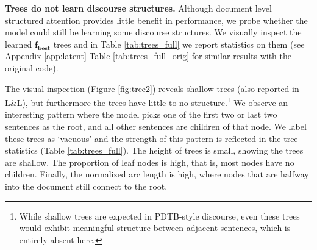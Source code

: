 \begin{table}[t]
\small
\centering
\renewcommand{\tabcolsep}{1.3mm}
\vspace{-0.7em}
\caption{Statistics for learned trees averaged across four runs (similar results without the design change or bug fix are in the Appendix \ref{app:latent} Table \ref{tab:trees_full_orig}). See Table \ref{tab:results_deeper} for gold statistics on WQTC.}
\label{tab:trees_full}
\end{table}

\medskip
\noindent\textbf{Trees do not learn discourse structures.} Although document  level structured attention provides little benefit in performance, we probe whether the model could still be learning some discourse structures. We visually inspect the learned $\mathbf{f_{best}}$ trees and in Table \ref{tab:trees_full} we report statistics on them (see Appendix \ref{app:latent} Table \ref{tab:trees_full_orig} for similar results with the original code).

The visual inspection (Figure \ref{fig:tree2}) reveals shallow trees (also reported in L\&L), but furthermore the trees have little to no structure.\footnote{While shallow trees are expected in PDTB-style discourse, even these trees would exhibit meaningful structure between adjacent sentences, which is entirely absent here. %
} We observe an interesting pattern where the model picks one of the first two or last two sentences as the root, and all other sentences are children of that node. We label these trees as `vacuous' and the strength of this pattern is  reflected in the tree statistics (Table \ref{tab:trees_full}). The height of trees is small, showing the trees are shallow. The proportion of leaf nodes is high, that is, most nodes have no children. Finally, 
the normalized arc length is high, where nodes that are  halfway into the document still connect to the root. 

